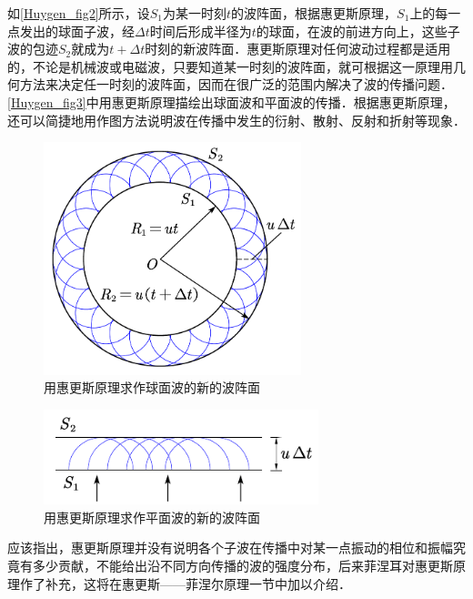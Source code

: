 如\autoref{Huygen_fig2}所示，设$S_1$为某一时刻$t $的波阵面，根据惠更斯原理，$S_1$上的每一点发出的球面子波，经$\Delta t$时间后形成半径为$t$的球面，在波的前进方向上，这些子波的包迹$S_2$就成为$t+\Delta t$时刻的新波阵面．惠更斯原理对任何波动过程都是适用的，不论是机械波或电磁波，只要知道某一时刻的波阵面，就可根据这一原理用几何方法来决定任一时刻的波阵面，因而在很广泛的范围内解决了波的传播问题．\autoref{Huygen_fig3}中用惠更斯原理描绘出球面波和平面波的传播．根据惠更斯原理，还可以简捷地用作图方法说明波在传播中发生的衍射、散射、反射和折射等现象．
\begin{figure}[ht]
\centering
\includegraphics[width=7.5cm]{./figures/Huygen_3.pdf}
\caption{用惠更斯原理求作球面波的新的波阵面} \label{Huygen_fig3}
\end{figure}
\begin{figure}[ht]
\centering
\includegraphics[width=8cm]{./figures/Huygen_4.pdf}
\caption{用惠更斯原理求作平面波的新的波阵面} \label{Huygen_fig4}
\end{figure}
应该指出，惠更斯原理并没有说明各个子波在传播中对某一点振动的相位和振幅究竟有多少贡献，不能给出沿不同方向传播的波的强度分布，后来菲涅耳对惠更斯原理作了补充，这将在惠更斯——菲涅尔原理一节中加以介绍．
